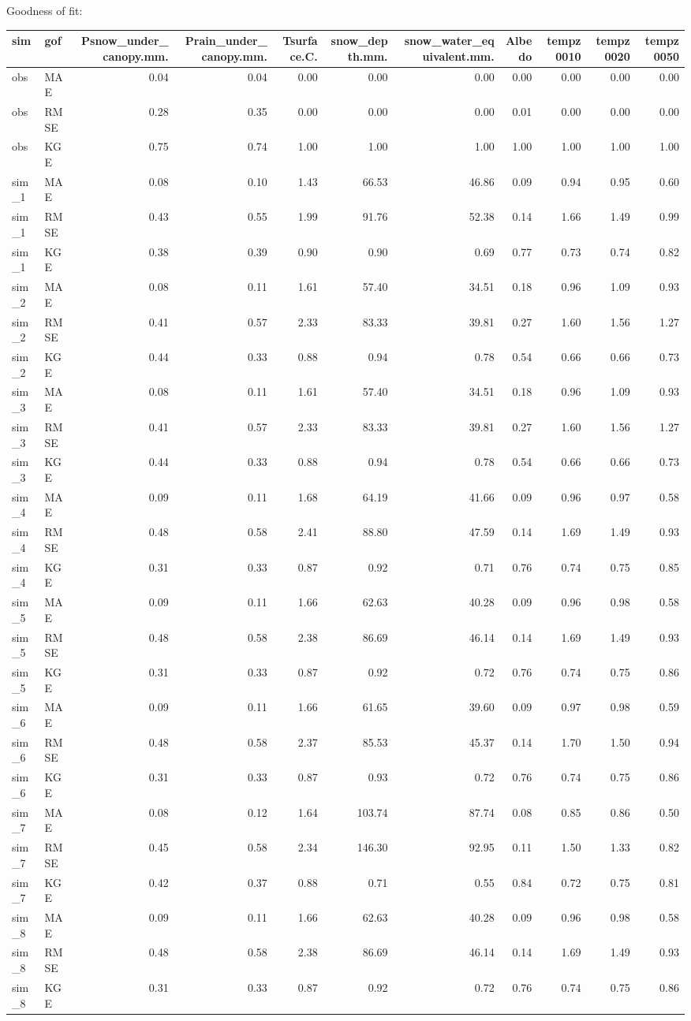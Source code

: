 \documentclass[
]{article}
\begin{document}
Goodness of fit:

\begin{longtable}[]{@{}llrrrrrrrrr@{}}
\toprule
sim & gof & Psnow\_under\_canopy.mm. & Prain\_under\_canopy.mm. &
Tsurface.C. & snow\_depth.mm. & snow\_water\_equivalent.mm. & Albedo &
tempz0010 & tempz0020 & tempz0050\tabularnewline
\midrule
\endhead
obs & MAE & 0.04 & 0.04 & 0.00 & 0.00 & 0.00 & 0.00 & 0.00 & 0.00 &
0.00\tabularnewline
obs & RMSE & 0.28 & 0.35 & 0.00 & 0.00 & 0.00 & 0.01 & 0.00 & 0.00 &
0.00\tabularnewline
obs & KGE & 0.75 & 0.74 & 1.00 & 1.00 & 1.00 & 1.00 & 1.00 & 1.00 &
1.00\tabularnewline
sim\_1 & MAE & 0.08 & 0.10 & 1.43 & 66.53 & 46.86 & 0.09 & 0.94 & 0.95 &
0.60\tabularnewline
sim\_1 & RMSE & 0.43 & 0.55 & 1.99 & 91.76 & 52.38 & 0.14 & 1.66 & 1.49
& 0.99\tabularnewline
sim\_1 & KGE & 0.38 & 0.39 & 0.90 & 0.90 & 0.69 & 0.77 & 0.73 & 0.74 &
0.82\tabularnewline
sim\_2 & MAE & 0.08 & 0.11 & 1.61 & 57.40 & 34.51 & 0.18 & 0.96 & 1.09 &
0.93\tabularnewline
sim\_2 & RMSE & 0.41 & 0.57 & 2.33 & 83.33 & 39.81 & 0.27 & 1.60 & 1.56
& 1.27\tabularnewline
sim\_2 & KGE & 0.44 & 0.33 & 0.88 & 0.94 & 0.78 & 0.54 & 0.66 & 0.66 &
0.73\tabularnewline
sim\_3 & MAE & 0.08 & 0.11 & 1.61 & 57.40 & 34.51 & 0.18 & 0.96 & 1.09 &
0.93\tabularnewline
sim\_3 & RMSE & 0.41 & 0.57 & 2.33 & 83.33 & 39.81 & 0.27 & 1.60 & 1.56
& 1.27\tabularnewline
sim\_3 & KGE & 0.44 & 0.33 & 0.88 & 0.94 & 0.78 & 0.54 & 0.66 & 0.66 &
0.73\tabularnewline
sim\_4 & MAE & 0.09 & 0.11 & 1.68 & 64.19 & 41.66 & 0.09 & 0.96 & 0.97 &
0.58\tabularnewline
sim\_4 & RMSE & 0.48 & 0.58 & 2.41 & 88.80 & 47.59 & 0.14 & 1.69 & 1.49
& 0.93\tabularnewline
sim\_4 & KGE & 0.31 & 0.33 & 0.87 & 0.92 & 0.71 & 0.76 & 0.74 & 0.75 &
0.85\tabularnewline
sim\_5 & MAE & 0.09 & 0.11 & 1.66 & 62.63 & 40.28 & 0.09 & 0.96 & 0.98 &
0.58\tabularnewline
sim\_5 & RMSE & 0.48 & 0.58 & 2.38 & 86.69 & 46.14 & 0.14 & 1.69 & 1.49
& 0.93\tabularnewline
sim\_5 & KGE & 0.31 & 0.33 & 0.87 & 0.92 & 0.72 & 0.76 & 0.74 & 0.75 &
0.86\tabularnewline
sim\_6 & MAE & 0.09 & 0.11 & 1.66 & 61.65 & 39.60 & 0.09 & 0.97 & 0.98 &
0.59\tabularnewline
sim\_6 & RMSE & 0.48 & 0.58 & 2.37 & 85.53 & 45.37 & 0.14 & 1.70 & 1.50
& 0.94\tabularnewline
sim\_6 & KGE & 0.31 & 0.33 & 0.87 & 0.93 & 0.72 & 0.76 & 0.74 & 0.75 &
0.86\tabularnewline
sim\_7 & MAE & 0.08 & 0.12 & 1.64 & 103.74 & 87.74 & 0.08 & 0.85 & 0.86
& 0.50\tabularnewline
sim\_7 & RMSE & 0.45 & 0.58 & 2.34 & 146.30 & 92.95 & 0.11 & 1.50 & 1.33
& 0.82\tabularnewline
sim\_7 & KGE & 0.42 & 0.37 & 0.88 & 0.71 & 0.55 & 0.84 & 0.72 & 0.75 &
0.81\tabularnewline
sim\_8 & MAE & 0.09 & 0.11 & 1.66 & 62.63 & 40.28 & 0.09 & 0.96 & 0.98 &
0.58\tabularnewline
sim\_8 & RMSE & 0.48 & 0.58 & 2.38 & 86.69 & 46.14 & 0.14 & 1.69 & 1.49
& 0.93\tabularnewline
sim\_8 & KGE & 0.31 & 0.33 & 0.87 & 0.92 & 0.72 & 0.76 & 0.74 & 0.75 &
0.86\tabularnewline
\bottomrule
\end{longtable}
\end{document}
